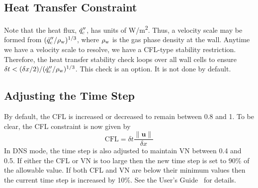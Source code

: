 \subsection{Heat Transfer Constraint}

Note that the heat flux, $\dot{q}''_{\rm c}$, has units of \unit{W/m^2}.  Thus, a velocity scale may be formed from $(\dot{q}''_{\rm c}/\rho_{\rm w})^{1/3}$, where $\rho_{\rm w}$ is the gas phase density at the wall. Anytime we have a velocity scale to resolve, we have a CFL-type stability restriction. Therefore, the heat transfer stability check loops over all wall cells to ensure $\delta t < (\delta x/2) / (\dot{q}''_{\rm c}/\rho_{\rm w})^{1/3}$.  This check is an option. It is not done by default.

\subsection{Adjusting the Time Step}

By default, the CFL is increased or decreased to remain between 0.8 and 1.  To be clear, the CFL constraint is now given by
\begin{equation}
\mbox{CFL} = \delta t \frac{\|\mathbf{u}\|}{\delta x}
\end{equation}
In DNS mode, the time step is also adjusted to maintain VN between 0.4 and 0.5. If either the CFL or VN is too large then the new time step is set to 90\% of the allowable value.  If both CFL and VN are below their minimum values then the current time step is increased by 10\%.  See the User's Guide~\cite{FDS_Users_Guide} for details.




